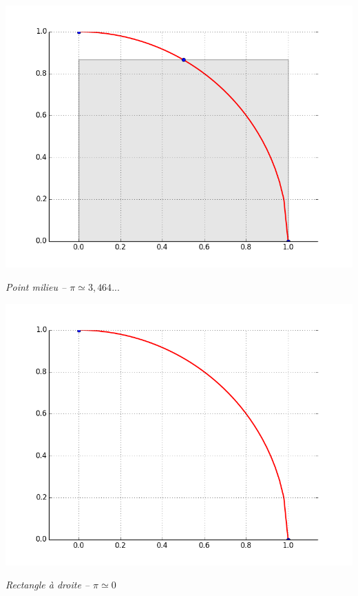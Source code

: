 \documentclass[10pt]{article}
\begin{document}
\begin{minipage}[c]{.24\linewidth}
\begin{center}
\includegraphics[width=.99\textwidth]{images/CourbesPython/pi_rect_m_1}

\textit{Point milieu -- $\pi \simeq 3,464...$}
\end{center}
\end{minipage}\hfill
\begin{minipage}[c]{.24\linewidth}
\begin{center}
\includegraphics[width=.99\textwidth]{images/CourbesPython/pi_rect_d_1}

\textit{Rectangle à droite -- $\pi \simeq 0$}
\end{center}
\end{minipage}
\end{document}
